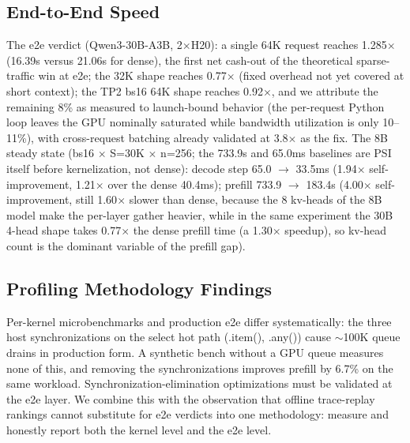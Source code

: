 \documentclass[11pt]{article}
\begin{document}
\subsection{End-to-End Speed}

The e2e verdict (Qwen3-30B-A3B, 2$\times$H20): a single 64K request reaches 1.285$\times$ (16.39s versus 21.06s for dense), the first net cash-out of the theoretical sparse-traffic win at e2e; the 32K shape reaches 0.77$\times$ (fixed overhead not yet covered at short context); the TP2 bs16 64K shape reaches 0.92$\times$, and we attribute the remaining 8\% as measured to launch-bound behavior (the per-request Python loop leaves the GPU nominally saturated while bandwidth utilization is only 10--11\%), with cross-request batching already validated at 3.8$\times$ as the fix. The 8B steady state (bs16 $\times$ S=30K $\times$ n=256; the 733.9s and 65.0ms baselines are PSI itself before kernelization, not dense): decode step 65.0 $\rightarrow$ 33.5ms (1.94$\times$ self-improvement, 1.21$\times$ over the dense 40.4ms); prefill 733.9 $\rightarrow$ 183.4s (4.00$\times$ self-improvement, still 1.60$\times$ slower than dense, because the 8 kv-heads of the 8B model make the per-layer gather heavier, while in the same experiment the 30B 4-head shape takes 0.77$\times$ the dense prefill time (a 1.30$\times$ speedup), so kv-head count is the dominant variable of the prefill gap).

\subsection{Profiling Methodology Findings}

Per-kernel microbenchmarks and production e2e differ systematically: the three host synchronizations on the select hot path (.item(), .any()) cause $\sim$100K queue drains in production form. A synthetic bench without a GPU queue measures none of this, and removing the synchronizations improves prefill by 6.7\% on the same workload. Synchronization-elimination optimizations must be validated at the e2e layer. We combine this with the observation that offline trace-replay rankings cannot substitute for e2e verdicts into one methodology: measure and honestly report both the kernel level and the e2e level.

\end{document}
